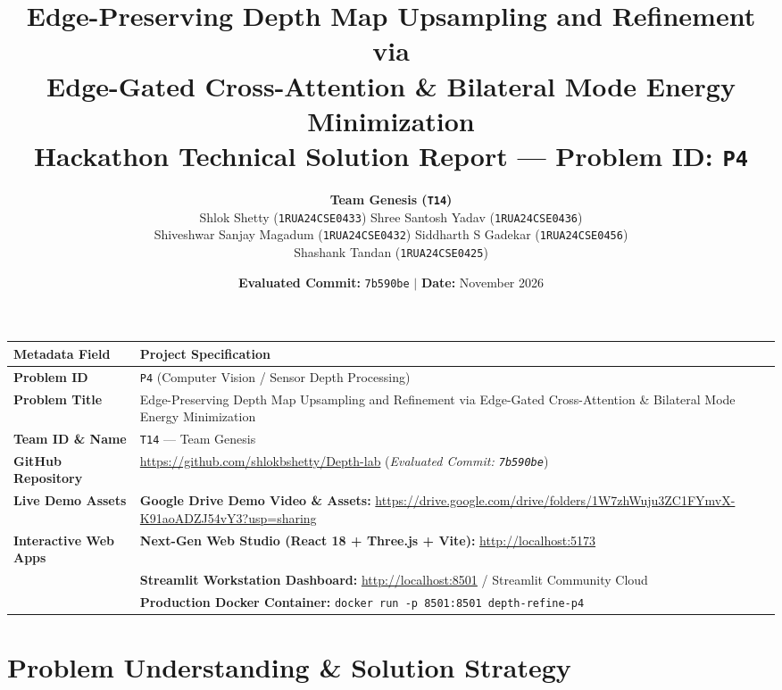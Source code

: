 \documentclass[10pt,a4paper]{article}
\title{\textbf{\LARGE Edge-Preserving Depth Map Upsampling and Refinement via\\Edge-Gated Cross-Attention \& Bilateral Mode Energy Minimization}\\[0.5em]
\large Hackathon Technical Solution Report --- Problem ID: \texttt{P4}}
\author{
    \textbf{Team Genesis (\texttt{T14})}\\[0.4em]
    Shlok Shetty (\texttt{1RUA24CSE0433}) \quad
    Shree Santosh Yadav (\texttt{1RUA24CSE0436})\\[0.2em]
    Shiveshwar Sanjay Magadum (\texttt{1RUA24CSE0432}) \quad
    Siddharth S Gadekar (\texttt{1RUA24CSE0456})\\[0.2em]
    Shashank Tandan (\texttt{1RUA24CSE0425})
}
\date{\textbf{Evaluated Commit:} \texttt{7b590be} \quad $\vert$ \quad \textbf{Date:} November 2026}
\begin{document}
\maketitle

\begin{table}[h!]
\centering
\small
\begin{tabularx}{\textwidth}{lX}
\toprule
\textbf{Metadata Field} & \textbf{Project Specification} \\
\midrule
\textbf{Problem ID} & \texttt{P4} (Computer Vision / Sensor Depth Processing) \\
\textbf{Problem Title} & Edge-Preserving Depth Map Upsampling and Refinement via Edge-Gated Cross-Attention \& Bilateral Mode Energy Minimization \\
\textbf{Team ID \& Name} & \texttt{T14} --- Team Genesis \\
\textbf{GitHub Repository} & \url{https://github.com/shlokbshetty/Depth-lab} (\textit{Evaluated Commit: \texttt{7b590be}}) \\
\textbf{Live Demo Assets} & \textbf{Google Drive Demo Video \& Assets:} \url{https://drive.google.com/drive/folders/1W7zhWuju3ZC1FYmvX-K91aoADZJ54vY3?usp=sharing} \\
\textbf{Interactive Web Apps} & \textbf{Next-Gen Web Studio (React 18 + Three.js + Vite):} \url{http://localhost:5173} \\
& \textbf{Streamlit Workstation Dashboard:} \url{http://localhost:8501} / Streamlit Community Cloud \\
& \textbf{Production Docker Container:} \texttt{docker run -p 8501:8501 depth-refine-p4} \\
\bottomrule
\end{tabularx}
\end{table}

\vspace{-1em}
\hrulefill

\section{Problem Understanding \& Solution Strategy}
\end{document}
